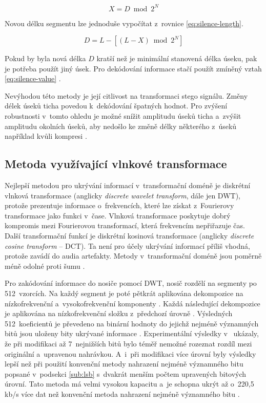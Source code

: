 \begin{equation}
    \label{eq:silence-value}
    X = D \bmod 2^N
\end{equation}

\noindent Novou délku segmentu lze jednoduše vypočítat z~rovnice
\ref{eq:silence-length}.

\begin{equation}
    \label{eq:silence-length}
    D = L - [(L - X) \bmod 2^N]
\end{equation}

\noindent Pokud by byla nová délka $D$ kratší než je minimální stanovená délka
úseku, pak je potřeba použít jiný úsek. Pro dekódování informace stačí použít
zmíněný vztah \ref{eq:silence-value} \cite{Shahreza2008}.

Nevýhodou této metody je její citlivost na transformaci stego signálu. Změny
délek úseků ticha povedou k~dekódování špatných hodnot. Pro zvýšení robustnosti
v~tomto ohledu je možné snížit amplitudu úseků ticha a~zvýšit amplitudu
okolních úseků, aby nedošlo ke změně délky některého z~úseků například kvůli
kompresi \cite{Djebbar2012}.

\subsection*{Metoda využívající vlnkové transformace}
\label{sub:wavelet-transform}

Nejlepší metodou pro ukrývání informací v~transformační doméně je diskrétní
vlnková transformace (anglicky \textit{discrete wavelet transform}, dále jen
DWT), protože prezentuje informace o~frekvencích, které lze získat z~Fourierovy
transformace jako funkci v~čase. Vlnková transformace poskytuje dobrý kompromis
mezi Fourierovou transformací, která frekvencím nepřiřazuje čas. Další
transformační funkcí je diskrétní kosinová transformace (anglicky
\textit{discrete cosine transform} -- DCT). Ta není pro účely ukrývání
informací příliš vhodná, protože zavádí do audia artefakty. Metody
v~transformační doméně jsou poměrně méně odolné proti šumu \cite{Dutta2020}.

Pro zakódování informace do nosiče pomocí DWT, nosič rozdělí na segmenty po
512~vzorcích. Na každý segment je poté pětkrát aplikována dekompozice na
nízkofrekvenční a~vysokofrekvenční komponenty \cite{Cvejic2002Wavelet}. Každá
následující dekompozice je aplikována na nízkofrekvenční složku z~předchozí
úrovně \cite{Prabakaran2012}. Výsledných 512~koeficientů je převedeno na
binární hodnoty do jejichž nejméně významných bitů jsou uloženy bity ukrývané
informace \cite{Cvejic2002Wavelet}. Experimentální výsledky
v~\cite{Cvejic2002Wavelet} ukázaly, že při modifikaci až 7~nejnižších bitů bylo
téměř nemožné rozeznat rozdíl mezi originální a~upravenou nahrávkou. A~i~při
modifikaci více úrovní byly výsledky lepší než při použití konvenční metody
nahrazení nejméně významného bitu popsané v~podsekci \ref{sub:lsb} s~dvakrát
menším počtem upravených bitových úrovní. Tato metoda má velmi vysokou kapacitu
a~je schopna ukrýt až o~220,5\,kb/s více dat než konvenční metoda nahrazení
nejméně významného bitu \cite{Cvejic2002Wavelet}.

